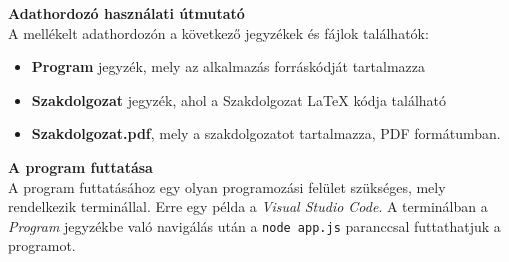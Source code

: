 \pagestyle{empty}

\noindent \textbf{\Large Adathordozó használati útmutató}\\

A mellékelt adathordozón a következő jegyzékek és fájlok találhatók:

\begin{itemize}
\item{\textbf{Program} jegyzék, mely az alkalmazás forráskódját tartalmazza}
\item{\textbf{Szakdolgozat} jegyzék, ahol a Szakdolgozat LaTeX kódja található}
\item{\textbf{Szakdolgozat.pdf}, mely a szakdolgozatot tartalmazza, PDF formátumban.}
\end{itemize}

\noindent \textbf{\large{A program futtatása}}\\

A program futtatásához egy olyan programozási felület szükséges, mely rendelkezik terminállal. Erre egy példa a \textit{Visual Studio Code}. A terminálban a \textit{Program} jegyzékbe való navigálás után a \texttt{node app.js} paranccsal futtathatjuk a programot.